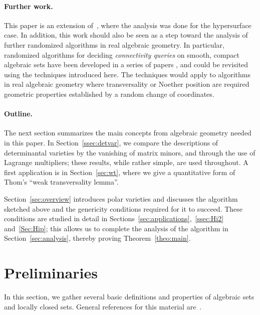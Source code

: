 \documentclass[12pt]{article}
\begin{document}
\paragraph*{Further work.}
This paper is an extension of~\cite{ElGiSc20}, where the analysis was
done for the hypersurface case. In addition, this work should also be
seen as a step toward the analysis of further randomized algorithms in
real algebraic geometry.  In particular, randomized algorithms for
deciding {\em connectivity queries} on smooth, compact algebraic sets
have been developed in a series of papers
\cite{SchostMohabBabySteps2011,SchostMohabBabySteps2014}, and could be
revisited using the techniques introduced here. The techniques would
apply to algorithms in real algebraic geometry where transversality or
Noether position are required geometric properties established by a
random change of coordinates.

\paragraph*{Outline.} The next section summarizes the main concepts from 
algebraic geometry needed in this paper. In Section~\ref{ssec:detvar},
we compare the descriptions of determinantal varieties by the
vanishing of matrix minors, and through the use of Lagrange
multipliers; these results, while rather simple, are used throughout.
A first application is in Section~\ref{sec:wt}, where we give a
quantitative form of Thom's ``weak transversality lemma''.

Section~\ref{sec:overview} introduces polar varieties and discusses the
algorithm sketched above and the genericity conditions required for it
to succeed. These conditions are studied in detail in
Sections~\ref{sec:applications},~\ref{ssec:Hi2} and~\ref{Sec:Hip};
this allows us to complete the analysis of the algorithm in
Section~\ref{sec:analysis}, thereby proving Theorem~\ref{theo:main}.


\section{Preliminaries}

In this section, we gather several basic definitions and properties of
algebraic sets and locally closed sets. General references for this
material are~\cite{Mumford76,Shafarevich77,ECA}.
\end{document}
